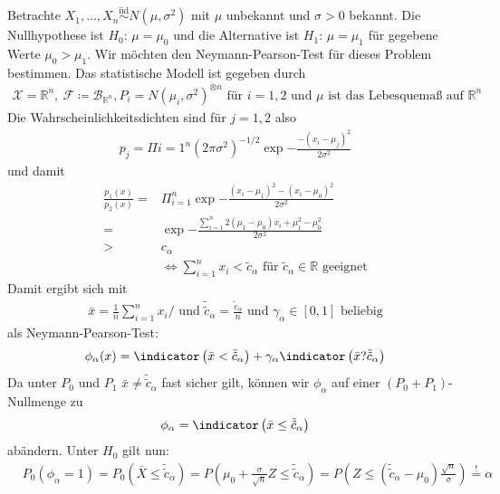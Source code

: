 \documentclass[a4paper]{scrartcl}
\begin{document}
		\begin{example}
			Betrachte $X_1,\dots,X_n\overset{\text{iid}}{\sim}N(\mu,\sigma^2)$ mit $\mu$ unbekannt und $\sigma>0$ bekannt. Die Nullhypothese ist $H_0$: $\mu=\mu_0$ und die Alternative ist $H_1$: $\mu=\mu_1$ für gegebene Werte $\mu_0>\mu_1$. Wir möchten den Neymann-Pearson-Test für dieses Problem bestimmen. Das statistische Modell ist gegeben durch
			\begin{align*}
				\mathcal{X}=\mathbb{R}^n,~\mathscr{F}\coloneq\mathscr{B}_{\mathbb{R}^n},P_i=N(\mu_i,\sigma^2)^{\otimes n}\text{ für }i=1,2\text{ und }\mu\text{ ist das Lebesquemaß auf }\mathbb{R}^n
			\end{align*}
			Die Wahrscheinlichkeitsdichten sind für $j=1,2$ also
			\begin{align*}
				p_j=\Pi{i=1}^n\left(2\pi\sigma^2\right)^{-1/2}\exp{-\frac{-(x_i-\mu_j)^2}{2\sigma^2}}
			\end{align*}
			und damit
			\begin{align*}
				\frac{p_1(x)}{p_2(x)}=&\Pi_{i=1}^n\exp{-\frac{(x_i-\mu_1)^2-(x_i-\mu_0)^2}{2\sigma^2}}\\
				=&\exp{-\frac{\sum_{i=1}^n2(\mu_1-\mu_0)x_i+\mu_1^2-\mu_0^2}{2\sigma^2}}\\
				>&c_\alpha\\
				&\Leftrightarrow \sum_{i=1}^n x_i<\tilde{c}_\alpha\text{ für }\tilde{c}_\alpha\in\mathbb{R}\text{ geeignet}
			\end{align*}
			Damit ergibt sich mit
			\begin{align*}
				\bar{x}=\frac{1}{n}\sum_{i=1}^nx_i/\text{ und }\tilde{\tilde{c}}_\alpha=\frac{\tilde{c}_\alpha}{n}\text{ und }\gamma_\alpha\in[0,1]\text{ beliebig}
			\end{align*}			 
			 als Neymann-Pearson-Test:
			\begin{align*}
				\phi_\alpha(x)=\indicator\left(\bar{x}<\tilde{\tilde{c}}_\alpha\right)+\gamma_\alpha\indicator\left(\bar{x}?\tilde{\tilde{c}}_\alpha\right)
			\end{align*}
			Da unter $P_0$ und $P_1$ $\bar{x}\neq\tilde{\tilde{c}}_\alpha$ fast sicher gilt, können wir $\phi_\alpha$ auf einer $(P_0+P_1)$-Nullmenge zu
			\begin{align*}
				\phi_\alpha=\indicator\left(\bar{x}\le \tilde{\tilde{c}}_\alpha\right)
			\end{align*}
			abändern. Unter $H_0$ gilt nun:
			\begin{align*}
				&P_0(\phi_\alpha=1)=P_0(\bar{X}\le \tilde{\tilde{c}}_\alpha)=P\left(\mu_0+\frac{\sigma}{\sqrt{n}}Z\le\tilde{\tilde{c}}_\alpha\right)=P\left(Z\le\left(\tilde{\tilde{c}}_\alpha-\mu_0\right)\frac{\sqrt{n}}{\sigma}\right)\overset{!}{=}\alpha\\

\end{align*}
\end{example}
\end{document}
